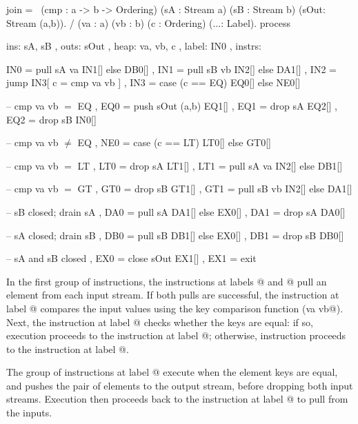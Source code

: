 \begin{process}[float,caption=Process implementation of \Hs/join/,label=figs/procs/impl/join]
join 
  = \ (cmp : a -> b -> Ordering)
      (sA  : Stream a) (sB : Stream b)
      (sOut: Stream (a,b)). 
    / (va : a) (vb : b) (c : Ordering) (...: Label).
    process
     { ins:    { sA, sB }
     , outs:   { sOut }
     , heap:   { va, vb, c }
     , label:  IN0
     , instrs: { IN0 = pull  sA va      IN1[] else DB0[]
               , IN1 = pull  sB vb      IN2[] else DA1[]
               , IN2 = jump             IN3[ c = cmp va vb ]
               , IN3 = case  (c == EQ)  EQ0[] else NE0[]

               -- cmp va vb $=$ EQ
               , EQ0 = push  sOut (a,b) EQ1[]
               , EQ1 = drop  sA         EQ2[]
               , EQ2 = drop  sB         IN0[]

               -- cmp va vb $\not=$ EQ
               , NE0 = case  (c == LT)  LT0[] else GT0[]

               -- cmp va vb $=$ LT
               , LT0 = drop  sA         LT1[]
               , LT1 = pull  sA va      IN2[] else DB1[]

               -- cmp va vb $=$ GT
               , GT0 = drop  sB         GT1[]
               , GT1 = pull  sB vb      IN2[] else DA1[]

               -- sB closed; drain sA
               , DA0 = pull  sA         DA1[] else EX0[]
               , DA1 = drop  sA         DA0[]

               -- sA closed; drain sB
               , DB0 = pull  sB         DB1[] else EX0[]
               , DB1 = drop  sB         DB0[]

               -- sA and sB closed
               , EX0 = close sOut       EX1[]
               , EX1 = exit } }
\end{process}

In the first group of instructions, the instructions at labels @ and @ pull an element from each input stream.
If both pulls are successful, the instruction at label @ compares the input values using the key comparison function (\lstiproc@cmp va vb@).
Next, the instruction at label @ checks whether the keys are equal: if so, execution proceeds to the instruction at label @; otherwise, instruction proceeds to the instruction at label @.

The group of instructions at label @ execute when the element keys are equal, and pushes the pair of elements to the output stream, before dropping both input streams.
Execution then proceeds back to the instruction at label @ to pull from the inputs.

